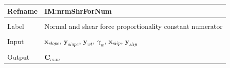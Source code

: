 \documentclass[12pt]{article}
\begin{document}
\vspace{\baselineskip}
\noindent
\begin{minipage}{\textwidth}
\begin{tabular}{>{\raggedright}p{}>{\raggedright\arraybackslash}p{}}
\toprule \textbf{Refname} & \textbf{IM:nrmShrForNum}
\label{IM:nrmShrForNum}
\\ \midrule \\
Label & Normal and shear force proportionality constant numerator
        
\\ \midrule \\
Input & ${\mathbf{x}_{slope}}$, ${\mathbf{y}_{slope}}$, ${\mathbf{y}_{wt}}$, ${γ_{w}}$, ${\mathbf{x}_{slip}}$, ${\mathbf{y}_{slip}}$
        
\\ \midrule \\
Output & ${\mathbf{C}_{num}}$
         

\end{tabular}
\end{minipage}
\end{document}
